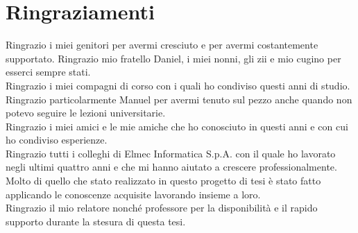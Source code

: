 \chapter*{Ringraziamenti}

\noindent Ringrazio i miei genitori per avermi cresciuto e per avermi costantemente supportato.
Ringrazio mio fratello Daniel, i miei nonni, gli zii e mio cugino per esserci sempre stati.\\

\noindent Ringrazio i miei compagni di corso con i quali ho condiviso questi anni di studio.
Ringrazio particolarmente Manuel per avermi tenuto sul pezzo anche quando non potevo 
seguire le lezioni universitarie.\\

\noindent Ringrazio i miei amici e le mie amiche che ho conosciuto in questi anni e 
con cui ho condiviso esperienze.\\

\noindent Ringrazio tutti i colleghi di Elmec Informatica S.p.A. con il quale ho 
lavorato negli ultimi quattro anni e che mi hanno aiutato a crescere professionalmente. 
Molto di quello che stato realizzato in questo progetto di tesi 
è stato fatto applicando le conoscenze acquisite lavorando insieme a loro.\\

\noindent Ringrazio il mio relatore nonché professore per la disponibilità e il 
rapido supporto durante la stesura di questa tesi.\\

